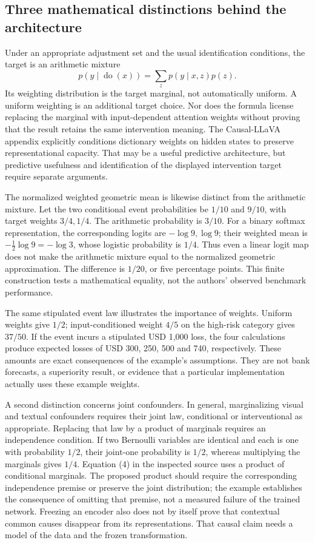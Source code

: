\subsection{Three mathematical distinctions behind the architecture}
Under an appropriate adjustment set and the usual identification conditions, the target is an arithmetic mixture
\[
 p(y\mid\operatorname{do}(x))=\sum_z p(y\mid x,z)p(z).
\]
Its weighting distribution is the target marginal, not automatically uniform. A uniform weighting is an additional target
choice. Nor does the formula license replacing the marginal with input-dependent attention weights without proving that the
result retains the same intervention meaning. The Causal-LLaVA appendix explicitly conditions dictionary weights on hidden
states to preserve representational capacity. That may be a useful predictive architecture, but predictive usefulness and
identification of the displayed intervention target require separate arguments.~\citep{exec28_fr_hu,pearl2009}

The normalized weighted geometric mean is likewise distinct from the arithmetic mixture. Let the two conditional event
probabilities be \(1/10\) and \(9/10\), with target weights \(3/4,1/4\). The arithmetic probability is \(3/10\).
For a binary softmax representation, the corresponding logits are \(-\log9,\log9\); their weighted mean is
\(-\tfrac12\log9=-\log3\), whose logistic probability is \(1/4\). Thus even a linear logit map does not make the arithmetic
mixture equal to the normalized geometric approximation. The difference is \(1/20\), or five percentage points.
This finite construction tests a mathematical equality, not the authors' observed benchmark performance.~\citep{exec28_fr_reference}

The same stipulated event law illustrates the importance of weights. Uniform weights give \(1/2\); input-conditioned
weight \(4/5\) on the high-risk category gives \(37/50\). If the event incurs a stipulated USD 1,000 loss, the four
calculations produce expected losses of USD 300, 250, 500 and 740, respectively. These amounts are exact consequences of
the example's assumptions. They are not bank forecasts, a superiority result, or evidence that a particular implementation
actually uses these example weights.~\citep{exec28_fr_reference}

A second distinction concerns joint confounders. In general, marginalizing visual and textual confounders requires their
joint law, conditional or interventional as appropriate. Replacing that law by a product of marginals requires an independence
condition. If two Bernoulli variables are identical and each is one with probability \(1/2\), their joint-one probability is
\(1/2\), whereas multiplying the marginals gives \(1/4\). Equation (4) in the inspected source uses a product of conditional
marginals. The proposed product should require the corresponding independence premise or preserve the joint distribution;
the example establishes the consequence of omitting that premise, not a measured failure of the trained network.
Freezing an encoder also does not by itself prove that contextual common causes disappear from its representations.
That causal claim needs a model of the data and the frozen transformation.~\citep{exec28_fr_hu,exec28_fr_reference}

